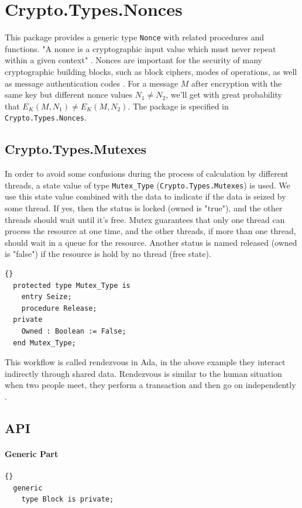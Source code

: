 \chapter{Crypto.Types.Nonces}
This package provides a generic type \texttt{Nonce} with related
procedures and functions. "A nonce is a cryptographic input value
which must never repeat within a given context"
\cite{DBLP:conf/isw/Zenner09}. Nonces are important for the security
of many cryptographic building blocks, such as block ciphers, modes of
operations, as well as message authentication codes
\cite{DBLP:conf/isw/Zenner09}. For a message $M$ after encryption with
the same key but different nonce values $N_1\neq N_2$, we'll get with
great probability that $E_K(M,N_1)\neq E_K(M,N_2)$. The package is
specified in \texttt{Crypto.Types.Nonces}.


\section{Crypto.Types.Mutexes}
In order to avoid some confusions during the process of calculation by
different threads, a state value of type \texttt{Mutex\_Type}
(\texttt{Crypto.Types.Mutexes}) is used. We use this state value
combined with the data to indicate if the data is seized by some
thread. If yes, then the status is locked (owned is "true"), and the
other threads should wait until it's free. Mutex guarantees that only
one thread can process the resource at one time, and the other
threads, if more than one thread, should wait in a queue for the
resource. Another status is named released (owned is "false") if the
resource is hold by no thread (free state).

\begin{lstlisting}{}
  protected type Mutex_Type is
    entry Seize;
    procedure Release;
  private
    Owned : Boolean := False;
  end Mutex_Type;
\end{lstlisting}
This workflow is called rendezvous in Ada, in the above example they
interact indirectly through shared data. Rendezvous is similar to the
human situation when two people meet, they perform a transaction and
then go on independently \cite{Ada2005}.

\section{API}
\subsubsection*{Generic Part}
\begin{lstlisting}{}
  generic
    type Block is private;
\end{lstlisting}
